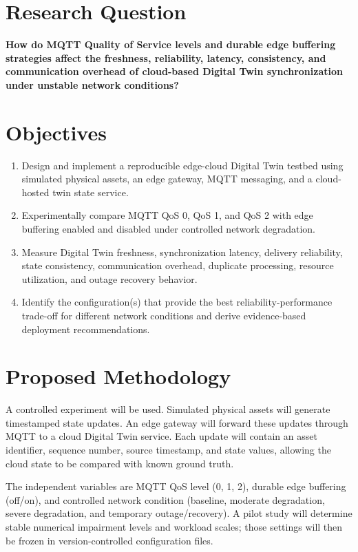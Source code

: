 \section{Research Question}
\textbf{How do MQTT Quality of Service levels and durable edge buffering strategies affect the freshness, reliability, latency, consistency, and communication overhead of cloud-based Digital Twin synchronization under unstable network conditions?}

\section{Objectives}
\begin{enumerate}
    \item Design and implement a reproducible edge-cloud Digital Twin testbed using simulated physical assets, an edge gateway, MQTT messaging, and a cloud-hosted twin state service.
    \item Experimentally compare MQTT QoS 0, QoS 1, and QoS 2 with edge buffering enabled and disabled under controlled network degradation.
    \item Measure Digital Twin freshness, synchronization latency, delivery reliability, state consistency, communication overhead, duplicate processing, resource utilization, and outage recovery behavior.
    \item Identify the configuration(s) that provide the best reliability-performance trade-off for different network conditions and derive evidence-based deployment recommendations.
\end{enumerate}

\section{Proposed Methodology}
A controlled experiment will be used. Simulated physical assets will generate timestamped state updates. An edge gateway will forward these updates through MQTT to a cloud Digital Twin service. Each update will contain an asset identifier, sequence number, source timestamp, and state values, allowing the cloud state to be compared with known ground truth.

The independent variables are MQTT QoS level (0, 1, 2), durable edge buffering (off/on), and controlled network condition (baseline, moderate degradation, severe degradation, and temporary outage/recovery). A pilot study will determine stable numerical impairment levels and workload scales; those settings will then be frozen in version-controlled configuration files.

